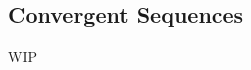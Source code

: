 \documentclass[../poma-notes.tex]{subfiles}
\begin{document}
\subsection*{Convergent Sequences}

WIP
\end{document}
